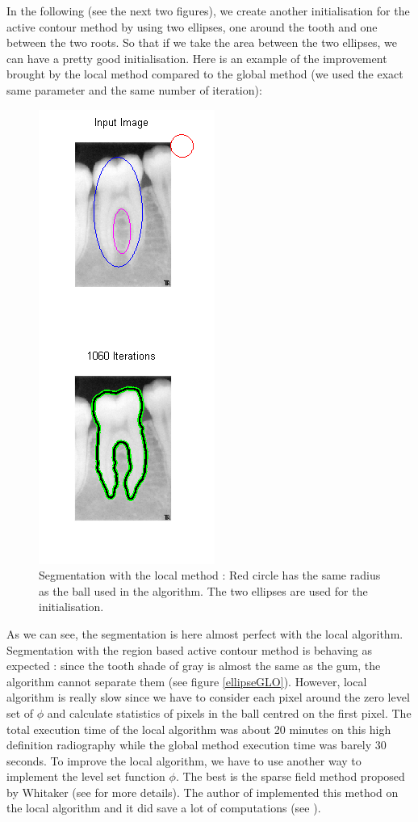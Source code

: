 In the following (see the next two figures), we create another initialisation for the active contour method by using two ellipses, one around the tooth and one between the two roots. So that if we take the area between the two ellipses, we can have a pretty good initialisation. Here is an example of the improvement brought by the local method compared to the global method (we used the exact same parameter and the same number of iteration): 
\begin{figure}[H]
\centering
\includegraphics[scale=0.8]{images/doubleEllipseTest_rx2.png}
\caption{Segmentation with the local method : Red circle has the same radius as the ball used in the algorithm. The two ellipses are used for the initialisation.}
\label{ellipseLO}
\end{figure}
As we can see, the segmentation is here almost perfect with the local algorithm. Segmentation with the region based active contour method is behaving as expected : since the tooth shade of gray is almost the same as the gum, the algorithm cannot separate them (see figure \ref{ellipseGLO}). However, local algorithm is really slow since we have to consider each pixel around the zero level set of $\phi$ and calculate statistics of pixels in the ball centred on the first pixel. The total execution time of the local algorithm was about 20 minutes on this high definition radiography while the global method execution time was barely 30 seconds. To improve the local algorithm, we have to use another way to implement the level set function $\phi$. The best is the sparse field method proposed by Whitaker (see \cite{whitaker} for more details). The author of \cite{lanktonLO} implemented this method on the local algorithm and it did save a lot of computations (see \cite{lanktonSFM}).     
